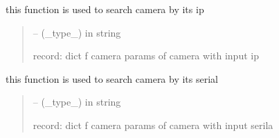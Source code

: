 \documentclass[letterpaper,10pt,english]{sphinxmanual}
\begin{document}
\begin{savenotes}
\begin{fulllineitems}
\begin{savenotes}
\begin{fulllineitems}
\end{fulllineitems}\end{savenotes}


\begin{savenotes}\begin{fulllineitems}
\label{\detokenize{setting/database_utils:oxin.database_utils.dataBaseUtils.search_camera_by_ip}}
\pysigstartsignatures
{}
\pysigstopsignatures
\sphinxAtStartPar
this function is used to search camera by its ip
\begin{quote}\begin{description}
\sphinxAtStartPar
{} – (\_type\_) in string

\sphinxAtStartPar
record: dict f camera params of camera with input ip

\end{description}\end{quote}

\end{fulllineitems}\end{savenotes}


\begin{savenotes}\begin{fulllineitems}
\label{\detokenize{setting/database_utils:oxin.database_utils.dataBaseUtils.search_camera_by_serial}}
\pysigstartsignatures
{}
\pysigstopsignatures
\sphinxAtStartPar
this function is used to search camera by its serial
\begin{quote}\begin{description}
\sphinxAtStartPar
{} – (\_type\_) in string

\sphinxAtStartPar
record: dict f camera params of camera with input serila


\end{description}
\end{quote}
\end{fulllineitems}
\end{savenotes}
\end{fulllineitems}
\end{savenotes}
\end{document}
